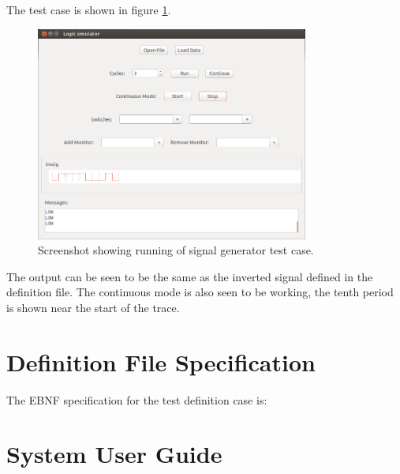 \documentclass[a4paper,10pt]{article}  %
\begin{document}
The test case is shown in figure \ref{fig:testsgss}.
\begin{figure}[!htb]
  \begin{center}
    \includegraphics[width=0.8\textwidth]{siggen_screenshot.png}
  \end{center}
  \caption{Screenshot showing running of signal generator test case.}
  \label{fig:testsgss}
\end{figure}
The output can be seen to be the same as the inverted signal defined
in the definition file. The continuous mode is also seen to be
working, the tenth period is shown near the start of the trace.

\FloatBarrier
\section{Definition File Specification}
\label{sec:defin-file-spec}

The EBNF specification for the test definition case is:



\section{System User Guide}
\label{sec:system-user-guide}
\end{document}
